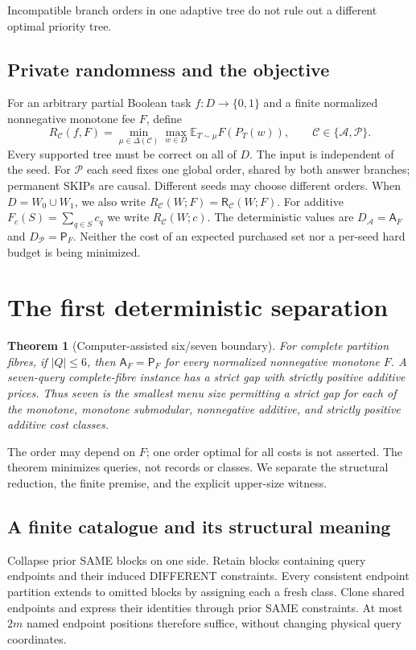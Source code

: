 \documentclass[pdflatex,sn-mathphys-num]{sn-jnl}
\newcommand{\A}{\mathsf{A}}
\newcommand{\Pcost}{\mathsf{P}}
\newcommand{\RR}{\mathsf{R}}
\theoremstyle{thmstyleone}
\newtheorem{theorem}{Theorem}
\theoremstyle{thmstylethree}
\theoremstyle{thmstyletwo}
\begin{document}
Incompatible branch orders in one adaptive tree do not rule out a different optimal priority tree.


\subsection{Private randomness and the objective}
For an arbitrary partial Boolean task $f:D\to\{0,1\}$ and a finite
normalized nonnegative monotone fee $F$, define
\[
 R_{\mathcal C}(f,F)=\min_{\mu\in\Delta(\mathcal C)}\max_{w\in D}
      \mathbb E_{T\sim\mu}F(P_T(w)),
 \qquad\mathcal C\in\{\mathcal A,\mathcal P\}.
\]
Every supported tree must be correct on all of $D$. The input is
independent of the seed. For $\mathcal P$ each seed fixes one global
order, shared by both answer branches; permanent SKIPs are causal.
Different seeds may choose different orders. When $D=W_0\cup W_1$,
we also write $R_{\mathcal C}(W;F)=\RR_{\mathcal C}(W;F)$.
For additive $F_c(S)=\sum_{q\in S}c_q$ we write $R_{\mathcal C}(W;c)$.
The deterministic values are $D_{\mathcal A}=\A_F$ and
$D_{\mathcal P}=\Pcost_F$. Neither the cost of an expected purchased
set nor a per-seed hard budget is being minimized.

\section{The first deterministic separation}\label{sec:det-thresholds}
\begin{theorem}[Computer-assisted six/seven boundary]\label{thm:boundary}
For complete partition fibres, if $|Q|\leq6$, then $\A_F=\Pcost_F$ for every normalized nonnegative monotone $F$. A seven-query complete-fibre instance has a strict gap with strictly positive additive prices. Thus seven is the smallest menu size permitting a strict gap for each of the monotone, monotone submodular, nonnegative additive, and strictly positive additive cost classes.
\end{theorem}
The order may depend on $F$; one order optimal for all costs is not asserted. The theorem minimizes queries, not records or classes. We separate the structural reduction, the finite premise, and the explicit upper-size witness.

\subsection{A finite catalogue and its structural meaning}\label{sec:catalogue}
Collapse prior SAME blocks on one side. Retain blocks containing query endpoints and their induced DIFFERENT constraints. Every consistent endpoint partition extends to omitted blocks by assigning each a fresh class. Clone shared endpoints and express their identities through prior SAME constraints. At most $2m$ named endpoint positions therefore suffice, without changing physical query coordinates.
\end{document}
